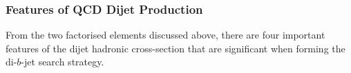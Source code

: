 
\subsubsection{Features of QCD Dijet Production}
\label{sec:theo-qcd-dijet_features}

From the two factorised elements discussed above,
there are four important features of the dijet hadronic cross-section
that are significant when forming the di-$b$-jet search strategy.%

